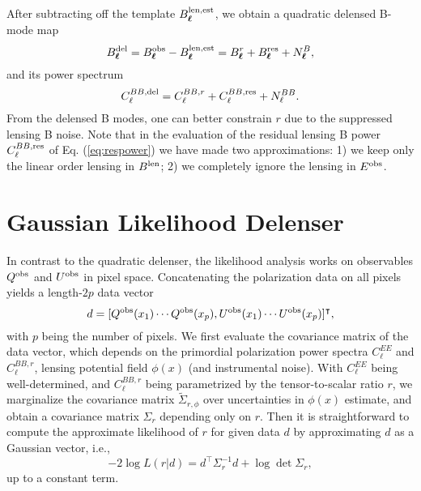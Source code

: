 \documentclass[aps, prd, reprint, nofootinbib, groupedaddress, showpacs]{revtex4-1}
\def\be{\begin{equation}}
\def\ee{\end{equation}}
\newcommand*\Bell{\ensuremath{\boldsymbol\ell}}
\begin{document}
After subtracting off the template $B_{\Bell}^{\rm len, est}$, we obtain a quadratic delensed B-mode map
\be
\label{eq:bdel}
B_{\Bell}^{\rm del} = B_{\Bell}^{\rm obs} - B_{\Bell}^{\rm len, est} = B_{\Bell}^r + B_{\Bell}^{\rm res} + N_{\Bell}^B,
\ee
and its power spectrum
\be
\label{eq:delpower}
C_\ell^{BB, {\rm del}} = C_\ell^{BB,r} + C_\ell^{BB, {\rm res}} + N^{BB}_\ell.
\ee
From the delensed B modes, one can better constrain $r$ due to the suppressed lensing B noise.
Note that in the evaluation of
the residual lensing B power
$C_\ell^{BB, {\rm res}} $ of Eq. (\ref{eq:respower}) we have made two approximations:
1) we keep only the linear order lensing in $B^{\rm len}$;
2) we completely ignore the lensing in $E^{\rm obs}$.

\section{Gaussian Likelihood Delenser}
\label{sec:like}

In contrast to the quadratic delenser, the likelihood analysis works on observables
$Q^{\rm obs}$ and $U^{\rm obs}$ in pixel space.
Concatenating the polarization data on all pixels yields a length-$2p$ data vector
\be
d = [Q^{\rm obs}(x_1) \cdots Q^{\rm obs}(x_p), U^{\rm obs}(x_1) \cdots  U^{\rm obs}(x_p)]^\intercal,
\ee
with $p$ being the number of pixels.
We first evaluate the covariance matrix of the data vector,
which depends on the primordial polarization power spectra $C_\ell^{EE}$ and $C_\ell^{BB,r}$,
lensing potential field $\phi(x)$ (and instrumental noise). With $C_\ell^{EE}$ being well-determined,
and $C_\ell^{BB,r}$ being parametrized by the tensor-to-scalar ratio $r$,
we marginalize the covariance matrix $\tilde \Sigma_{r,\phi}$ over uncertainties in $\phi(x)$ estimate,
and obtain a covariance matrix $\Sigma_r$ depending only on $r$. Then it is straightforward to compute the approximate likelihood of $r$ for given data $d$
by approximating $d$ as a Gaussian vector, i.e.,
\be
\label{eq:likeli}
    -2\log L(r|d) = d^\intercal\Sigma^{-1}_r d + \log \det\Sigma_r,
\ee
up to a constant term.
\end{document}
